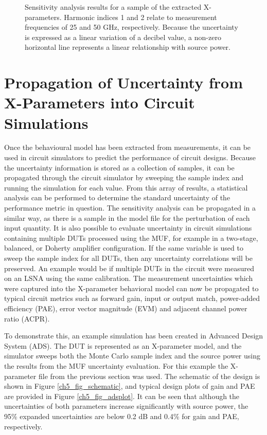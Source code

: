 \documentclass[../thesis/thesis.tex]{subfiles}
\begin{document}
\begin{figure}
\begin{subfigure}{0.45\textwidth}
		\label{ch5_fig_t2121phasesens}
	\end{subfigure}
	\caption[Sensitivity analysis results for a sample of the extracted X-parameters.]{Sensitivity analysis results for a sample of the extracted X-parameters. Harmonic indices 1 and 2 relate to measurement frequencies of 25 and 50 GHz, respectively. Because the uncertainty is expressed as a linear variation of a decibel value, a non-zero horizontal line represents a linear relationship with source power.}
	\label{ch5_fig_sensplots}
\end{figure}

\section{Propagation of Uncertainty from X-Parameters into Circuit Simulations}

Once the behavioural model has been extracted from measurements, it can be used in circuit simulators to predict the performance of circuit designs. Because the uncertainty information is stored as a collection of samples, it can be propagated through the circuit simulator by sweeping the sample index and running the simulation for each value. From this array of results, a statistical analysis can be performed to determine the standard uncertainty of the performance metric in question. The sensitivity analysis can be propagated in a similar way, as there is a sample in the model file for the perturbation of each input quantity. It is also possible to evaluate uncertainty in circuit simulations containing multiple DUTs processed using the MUF, for example in a two-stage, balanced, or Doherty amplifier configuration. If the same variable is used to sweep the sample index for all DUTs, then any uncertainty correlations will be preserved. An example would be if multiple DUTs in the circuit were measured on an LSNA using the same calibration.
The measurement uncertainties which were captured into the X-parameter behavioral model can now be propagated to typical circuit metrics such as forward gain, input or output match, power-added efficiency (PAE), error vector magnitude (EVM) and adjacent channel power ratio (ACPR).

To demonstrate this, an example simulation has been created in Advanced Design System (ADS). The DUT is represented as an X-parameter model, and the simulator sweeps both the Monte Carlo sample index and the source power using the results from the MUF uncertainty evaluation. For this example the X-parameter file from the previous section was used. The schematic of the design is shown in Figure \ref{ch5_fig_schematic}, and typical design plots of gain and PAE are provided in Figure \ref{ch5_fig_adsplot}. It can be seen that although the uncertainties of both parameters increase significantly with source power, the 95\% expanded uncertainties are below 0.2 dB and 0.4\% for gain and PAE, respectively.
\end{document}
